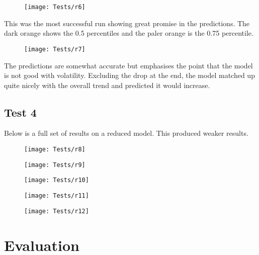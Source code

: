 \documentclass{article}
\begin{document}
\begin{figure}[H]
    \centering
    \texttt{[image: Tests/r6]}
    \caption{}
\end{figure}
This was the most successful run showing great promise in the predictions. The
dark orange shows the 0.5 percentiles and the paler orange is the 0.75 percentile.
\begin{figure}[H]
    \centering
    \texttt{[image: Tests/r7]}
    \caption{}
\end{figure}
The predictions are somewhat accurate but emphasises the point that the
model is not good with volatility. Excluding the drop at the end, the model
matched up quite nicely with the overall trend and predicted it would increase.
\clearpage

\subsection{Test 4}

Below is a full set of results on a reduced model. This produced weaker results.
\begin{figure}[H]
    \centering
    \texttt{[image: Tests/r8]}
    \caption{}
\end{figure}
\begin{figure}[H]
    \centering
    \texttt{[image: Tests/r9]}
    \caption{}
\end{figure}
\begin{figure}[H]
    \centering
    \texttt{[image: Tests/r10]}
    \caption{}
\end{figure}
\begin{figure}[H]
    \centering
    \texttt{[image: Tests/r11]}
    \caption{}
\end{figure}
\begin{figure}[H]
    \centering
    \texttt{[image: Tests/r12]}
    \caption{}
\end{figure}




\clearpage




\clearpage
\section{Evaluation}
\end{document}
